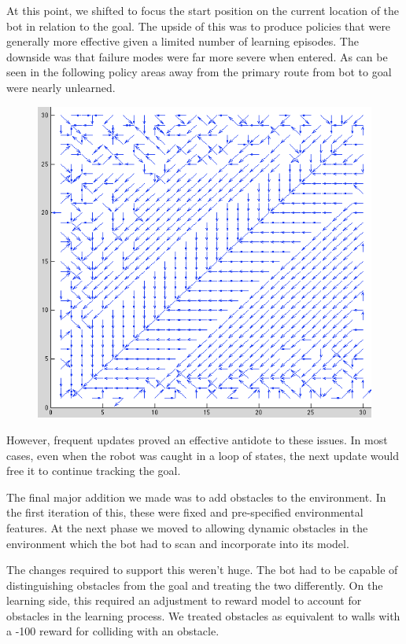 \documentclass{aiaa-tc}%
\begin{document}
At this point, we shifted to focus the start position
on the current location of the bot in relation to the goal. The upside
of this was to produce policies that were generally more effective
given a limited number of learning episodes. The downside was that
failure modes were far more severe when entered. As can be seen in the
following policy areas away from the primary route from bot to goal
were nearly unlearned.

\vspace{.3in}

\begin{figure}[htbp]
  \centering
  \includegraphics[width=\linewidth]{images/BasicPolicy.png} 
  \label{fig:basicQ}
\end{figure}
\clearpage

However, frequent updates proved an effective antidote to these
issues. In most cases, even when the robot was caught in a loop of
states, the next update would free it to continue tracking the goal.

The final major addition we made was to add obstacles to the
environment. In the first iteration of this, these were fixed and
pre-specified environmental features. At the next phase we moved to
allowing dynamic obstacles in the environment which the bot had to
scan and incorporate into its model.

The changes required to support this weren't huge. The bot had to be
capable of distinguishing obstacles from the goal and treating the two
differently. On the learning side, this required an adjustment to
reward model to account for obstacles in the learning
process. We treated obstacles as equivalent to walls with a -100
reward for colliding with an obstacle.
\end{document}

